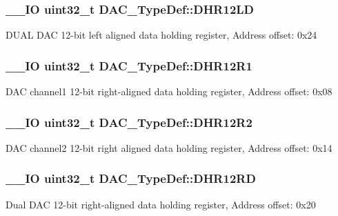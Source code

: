 \subsubsection[{D\+H\+R12\+L\+D}]{\setlength{\rightskip}{0pt plus 5cm}\+\_\+\+\_\+\+I\+O uint32\+\_\+t D\+A\+C\+\_\+\+Type\+Def\+::\+D\+H\+R12\+L\+D}\label{struct_d_a_c___type_def_aea4d055e3697999b44cdcf2702d79d40}
D\+U\+A\+L D\+A\+C 12-\/bit left aligned data holding register, Address offset\+: 0x24 \hypertarget{struct_d_a_c___type_def_afbfd2855cdb81939b4efc58e08aaf3e5}{}
\subsubsection[{D\+H\+R12\+R1}]{\setlength{\rightskip}{0pt plus 5cm}\+\_\+\+\_\+\+I\+O uint32\+\_\+t D\+A\+C\+\_\+\+Type\+Def\+::\+D\+H\+R12\+R1}\label{struct_d_a_c___type_def_afbfd2855cdb81939b4efc58e08aaf3e5}
D\+A\+C channel1 12-\/bit right-\/aligned data holding register, Address offset\+: 0x08 \hypertarget{struct_d_a_c___type_def_ab1f777540c487c26bf27e6fa37a644cc}{}
\subsubsection[{D\+H\+R12\+R2}]{\setlength{\rightskip}{0pt plus 5cm}\+\_\+\+\_\+\+I\+O uint32\+\_\+t D\+A\+C\+\_\+\+Type\+Def\+::\+D\+H\+R12\+R2}\label{struct_d_a_c___type_def_ab1f777540c487c26bf27e6fa37a644cc}
D\+A\+C channel2 12-\/bit right aligned data holding register, Address offset\+: 0x14 \hypertarget{struct_d_a_c___type_def_affa5cc9fe0cc9eb594d703bdc9d9abd9}{}
\subsubsection[{D\+H\+R12\+R\+D}]{\setlength{\rightskip}{0pt plus 5cm}\+\_\+\+\_\+\+I\+O uint32\+\_\+t D\+A\+C\+\_\+\+Type\+Def\+::\+D\+H\+R12\+R\+D}\label{struct_d_a_c___type_def_affa5cc9fe0cc9eb594d703bdc9d9abd9}
Dual D\+A\+C 12-\/bit right-\/aligned data holding register, Address offset\+: 0x20 \hypertarget{struct_d_a_c___type_def_a3a382d341fb608a04390bacb8c00b0f0}{}
